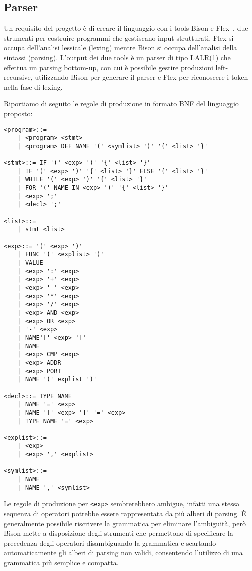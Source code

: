 \documentclass[10pt]{article}
\begin{document}
\subsection{Parser}

Un requisito del progetto è di creare il linguaggio con i tools Bison e Flex~\cite{levine2009flex}, due strumenti per costruire programmi che gestiscano input strutturati. Flex si occupa dell'analisi lessicale (lexing) mentre Bison si occupa dell'analisi della sintassi (parsing). L'output dei due tools è un parser di tipo LALR(1) che effettua un parsing bottom-up, con cui è possibile gestire  produzioni left-recursive, utilizzando Bison per generare il parser e Flex per riconoscere i token nella fase di lexing.

Riportiamo di seguito le regole di produzione in formato BNF del linguaggio proposto:

\begin{lstlisting}
<program>::= 
	| <program> <stmt>
	| <program> DEF NAME '(' <symlist> ')' '{' <list> '}'  

<stmt>::= IF '(' <exp> ')' '{' <list> '}' 
	| IF '(' <exp> ')' '{' <list> '}' ELSE '{' <list> '}'  
	| WHILE '(' <exp> ')' '{' <list> '}'    
	| FOR '(' NAME IN <exp> ')' '{' <list> '}'  
	| <exp> ';'
	| <decl> ';'

<list>::=
	| stmt <list> 

<exp>::= '(' <exp> ')'         
	| FUNC '(' <explist> ')' 
	| VALUE              
	| <exp> ':' <exp>         
	| <exp> '+' <exp>         
	| <exp> '-' <exp>         
	| <exp> '*' <exp>          
	| <exp> '/' <exp>          
	| <exp> AND <exp>          
	| <exp> OR <exp>           
	| '-' <exp>
	| NAME'[' <exp> ']'          
	| NAME                 
	| <exp> CMP <exp>          
	| <exp> ADDR             
	| <exp> PORT             
	| NAME '(' explist ')' 

<decl>::= TYPE NAME          
	| NAME '=' <exp>                    
	| NAME '[' <exp> ']' '=' <exp>
	| TYPE NAME '=' <exp>     

<explist>::=
	| <exp>
	| <exp> ',' <explist> 

<symlist>::= 
	| NAME       
	| NAME ',' <symlist>
\end{lstlisting}

Le regole di produzione per \texttt{<exp>} sembrerebbero ambigue, infatti una stessa sequenza di operatori potrebbe essere rappresentata da più alberi di parsing. È generalmente possibile riscrivere la grammatica per eliminare l'ambiguità, però Bison mette a disposizione degli strumenti che permettono di specificare la precedenza degli operatori disambiguando la grammatica e scartando automaticamente gli alberi di parsing non validi, consentendo l'utilizzo di una grammatica più semplice e compatta.
\end{document}
